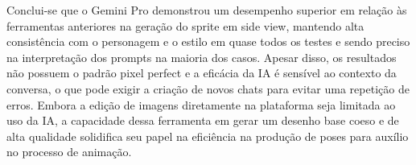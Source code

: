 Conclui-se que o Gemini Pro demonstrou um desempenho superior em relação às ferramentas anteriores na geração do sprite em side view, mantendo alta consistência com o personagem e o estilo em quase todos os testes e sendo preciso na interpretação dos prompts na maioria dos casos. Apesar disso, os resultados não possuem o padrão pixel perfect e a eficácia da IA é sensível ao contexto da conversa, o que pode exigir a criação de novos chats para evitar uma repetição de erros. Embora a edição de imagens diretamente na plataforma seja limitada ao uso da IA, a capacidade dessa ferramenta em gerar um desenho base coeso e de alta qualidade solidifica seu papel na eficiência na produção de poses para auxílio no processo de animação.

